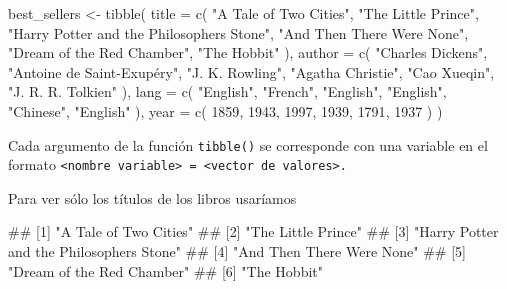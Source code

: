 \documentclass[
  title=normal,
  notoc,
  bib=normal]{mnye}
\newenvironment{Shaded}{\begin{snugshade}}{\end{snugshade}}
\newcommand{\AttributeTok}[1]{\textcolor[rgb]{0.77,0.63,0.00}{#1}}
\newcommand{\DecValTok}[1]{\textcolor[rgb]{0.00,0.00,0.81}{#1}}
\newcommand{\FunctionTok}[1]{\textcolor[rgb]{0.00,0.00,0.00}{#1}}
\newcommand{\NormalTok}[1]{#1}
\newcommand{\OtherTok}[1]{\textcolor[rgb]{0.56,0.35,0.01}{#1}}
\newcommand{\SpecialCharTok}[1]{\textcolor[rgb]{0.00,0.00,0.00}{#1}}
\newcommand{\StringTok}[1]{\textcolor[rgb]{0.31,0.60,0.02}{#1}}
\begin{document}
\begin{Shaded}
\begin{Highlighting}[]
\NormalTok{best\_sellers }\OtherTok{\textless{}{-}} \FunctionTok{tibble}\NormalTok{(}
    \AttributeTok{title =} \FunctionTok{c}\NormalTok{(}
        \StringTok{"A Tale of Two Cities"}\NormalTok{, }
        \StringTok{"The Little Prince"}\NormalTok{,}
        \StringTok{"Harry Potter and the Philosopher\textquotesingle{}s Stone"}\NormalTok{,}
        \StringTok{"And Then There Were None"}\NormalTok{,}
        \StringTok{"Dream of the Red Chamber"}\NormalTok{,}
        \StringTok{"The Hobbit"}
\NormalTok{    ),}
    \AttributeTok{author =} \FunctionTok{c}\NormalTok{(}
        \StringTok{"Charles Dickens"}\NormalTok{,}
        \StringTok{"Antoine de Saint{-}Exupéry"}\NormalTok{,}
        \StringTok{"J. K. Rowling"}\NormalTok{,}
        \StringTok{"Agatha Christie"}\NormalTok{,}
        \StringTok{"Cao Xueqin"}\NormalTok{,}
        \StringTok{"J. R. R. Tolkien"}
\NormalTok{    ),}
    \AttributeTok{lang =} \FunctionTok{c}\NormalTok{(}
        \StringTok{"English"}\NormalTok{,}
        \StringTok{"French"}\NormalTok{,}
        \StringTok{"English"}\NormalTok{,}
        \StringTok{"English"}\NormalTok{,}
        \StringTok{"Chinese"}\NormalTok{,}
        \StringTok{"English"}
\NormalTok{    ),}
    \AttributeTok{year =} \FunctionTok{c}\NormalTok{(}
        \DecValTok{1859}\NormalTok{,}
        \DecValTok{1943}\NormalTok{,}
        \DecValTok{1997}\NormalTok{,}
        \DecValTok{1939}\NormalTok{,}
        \DecValTok{1791}\NormalTok{,}
        \DecValTok{1937}
\NormalTok{    )}
\NormalTok{)}
\end{Highlighting}
\end{Shaded}

Cada argumento de la función \texttt{tibble()} se corresponde con una variable en el formato \texttt{\textless{}nombre\ variable\textgreater{}\ =\ \textless{}vector\ de\ valores\textgreater{}.}

Para ver sólo los títulos de los libros usaríamos

\begin{Shaded}
\end{Shaded}

\begin{Shaded}
\begin{Highlighting}[]
\NormalTok{\#\# [1] "A Tale of Two Cities"                    }
\NormalTok{\#\# [2] "The Little Prince"                       }
\NormalTok{\#\# [3] "Harry Potter and the Philosopher\textquotesingle{}s Stone"}
\NormalTok{\#\# [4] "And Then There Were None"                }
\NormalTok{\#\# [5] "Dream of the Red Chamber"                }
\NormalTok{\#\# [6] "The Hobbit"}
\end{Highlighting}
\end{Shaded}
\end{document}
